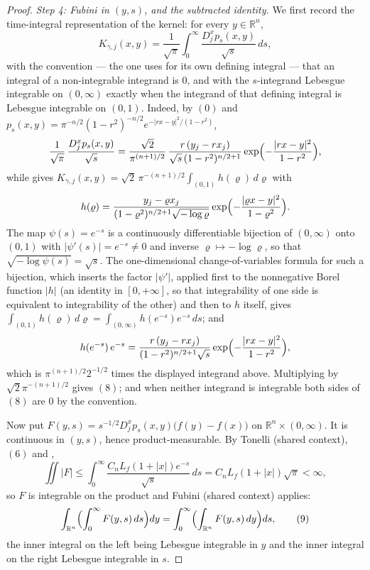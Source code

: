 \begin{proof}
\emph{Step 4: Fubini in $(y,s)$, and the subtracted identity.}
We first record the time-integral representation of the kernel: for every
$y \in \mathbb{R}^n$,
\begin{equation*}
  K_{\gamma,j}(x,y)
    = \frac{1}{\sqrt\pi}\int_0^\infty \frac{D_j^xp_s(x,y)}{\sqrt s}\,ds ,
  \tag{8}
\end{equation*}
with the convention --- the one  uses for its own
defining integral --- that an integral of a non-integrable integrand is $0$, and
with the $s$-integrand Lebesgue integrable on $(0,\infty)$ exactly when the
integrand of that defining integral is Lebesgue integrable on $(0,1)$.  Indeed,
by $(0)$ and $p_s(x,y) = \pi^{-n/2}(1-r^2)^{-n/2}e^{-|rx-y|^2/(1-r^2)}$,
\[
  \frac{1}{\sqrt\pi}\,\frac{D_j^xp_s(x,y)}{\sqrt s}
    = \frac{\sqrt2}{\pi^{(n+1)/2}}\,
      \frac{r\,(y_j-rx_j)}{\sqrt s\,(1-r^2)^{n/2+1}}
      \exp\Bigl(-\frac{|rx-y|^2}{1-r^2}\Bigr) ,
\]
while  gives
$K_{\gamma,j}(x,y) = \sqrt2\,\pi^{-(n+1)/2}\int_{(0,1)}h(\varrho)\,d\varrho$
with
\[
  h(\varrho) = \frac{y_j-\varrho x_j}{(1-\varrho^2)^{n/2+1}\sqrt{-\log\varrho}}
      \exp\Bigl(-\frac{|\varrho x-y|^2}{1-\varrho^2}\Bigr) .
\]
The map $\psi(s) = e^{-s}$ is a continuously differentiable bijection of
$(0,\infty)$ onto $(0,1)$ with $|\psi'(s)| = e^{-s} \neq 0$ and inverse
$\varrho\mapsto-\log\varrho$, so that $\sqrt{-\log\psi(s)} = \sqrt s$.  The
one-dimensional change-of-variables formula for such a bijection, which inserts
the factor $|\psi'|$, applied first to the nonnegative Borel function $|h|$ (an
identity in $[0,+\infty]$, so that integrability of one side is equivalent to
integrability of the other) and then to $h$ itself, gives
$\int_{(0,1)}h(\varrho)\,d\varrho = \int_{(0,\infty)}h(e^{-s})e^{-s}\,ds$; and
\[
  h(e^{-s})\,e^{-s}
    = \frac{r\,(y_j-rx_j)}{(1-r^2)^{n/2+1}\sqrt s}
      \exp\Bigl(-\frac{|rx-y|^2}{1-r^2}\Bigr) ,
\]
which is $\pi^{(n+1)/2}2^{-1/2}$ times the displayed integrand above.
Multiplying by $\sqrt2\pi^{-(n+1)/2}$ gives $(8)$; and when neither integrand is
integrable both sides of $(8)$ are $0$ by the convention.

Now put $F(y,s) = s^{-1/2}D_j^xp_s(x,y)\bigl(f(y)-f(x)\bigr)$ on
$\mathbb{R}^n\times(0,\infty)$.  It is continuous in $(y,s)$, hence
product-measurable.  By Tonelli (shared context), $(6)$ and
,
\[
  \iint |F|
    \leq \int_0^\infty \frac{C_nL_f(1+|x|)e^{-s}}{\sqrt s}\,ds
    = C_nL_f(1+|x|)\sqrt\pi < \infty ,
\]
so $F$ is integrable on the product and Fubini (shared context) applies:
\begin{equation*}
  \int_{\mathbb{R}^n}\Bigl(\int_0^\infty F(y,s)\,ds\Bigr)dy
    = \int_0^\infty\Bigl(\int_{\mathbb{R}^n}F(y,s)\,dy\Bigr)ds , \tag{9}
\end{equation*}
the inner integral on the left being Lebesgue integrable in $y$ and the inner
integral on the right Lebesgue integrable in $s$.


\end{proof}
